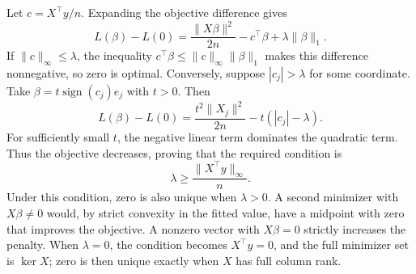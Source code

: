 Let $c=X^\top y/n$. Expanding the objective difference gives
\[
 L(\beta)-L(0)
 =\frac{\|X\beta\|^2}{2n}-c^\top\beta
   +\lambda\|\beta\|_1.
\]
If $\|c\|_\infty\le\lambda$, the inequality $c^\top\beta\le\|c\|_\infty\|\beta\|_1$ makes this difference nonnegative, so zero is optimal.
Conversely, suppose $|c_j|>\lambda$ for some coordinate. Take $\beta=t\operatorname{sign}(c_j)e_j$ with $t>0$. Then
\[
 L(\beta)-L(0)
 =\frac{t^2\|X_j\|^2}{2n}-t(|c_j|-\lambda).
\]
For sufficiently small $t$, the negative linear term dominates the quadratic term. Thus the objective decreases, proving that the required condition is
\[
 \boxed{\lambda\ge\frac{\|X^\top y\|_\infty}{n}}.
\]
Under this condition, zero is also unique when $\lambda>0$. A second minimizer with $X\beta\ne0$ would, by strict convexity in the fitted value, have a midpoint with zero that improves the objective. A nonzero vector with $X\beta=0$ strictly increases the penalty. When $\lambda=0$, the condition becomes $X^\top y=0$, and the full minimizer set is $\ker X$; zero is then unique exactly when $X$ has full column rank.

